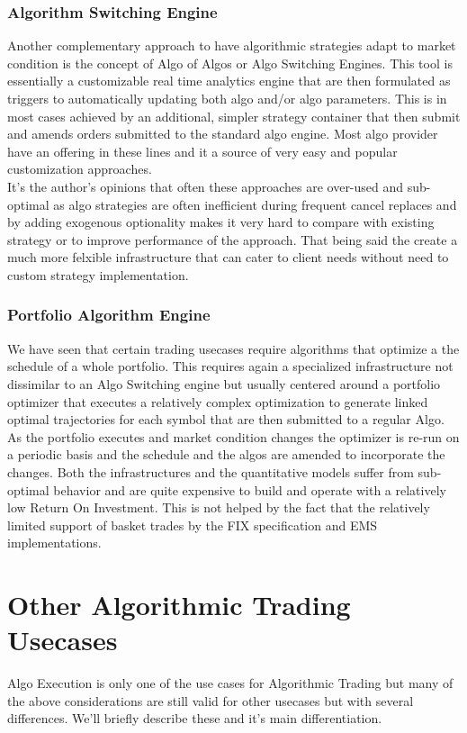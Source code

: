 \subsubsection{Algorithm Switching Engine}
Another complementary approach to have algorithmic strategies adapt to market condition is the concept of Algo of Algos or Algo Switching Engines. This tool is essentially a customizable real time analytics engine that are then formulated as triggers to automatically updating both algo and/or algo parameters. This is in most cases achieved by an additional, simpler strategy container that then submit and amends orders submitted to the standard algo engine. Most algo provider have an offering in these lines and it a source of very easy and popular customization approaches.\\

It's the author's opinions that often these approaches are over-used and sub-optimal as algo strategies are often inefficient during frequent cancel replaces and by adding exogenous optionality makes it very hard to compare with existing strategy or to improve performance of the approach. That being said the create a much more felxible infrastructure that can cater to client needs without need to custom strategy implementation.

\subsubsection{Portfolio Algorithm Engine}
We have seen that certain trading usecases require algorithms that optimize a the schedule of a whole portfolio. This requires again a specialized infrastructure not dissimilar to an Algo Switching engine but usually centered around a portfolio optimizer that executes a relatively complex optimization to generate linked optimal trajectories for each symbol that are then submitted to a regular Algo. As the portfolio executes and market condition changes the optimizer is re-run on a periodic basis and the schedule and the algos are amended to incorporate the changes. Both the infrastructures and the quantitative models suffer from sub-optimal behavior and are quite expensive to build and operate with a relatively low Return On Investment. This is not helped by the fact that the relatively limited  support of basket trades by the FIX specification and EMS implementations.

\section{Other Algorithmic Trading Usecases}
Algo Execution is only one of the use cases for Algorithmic Trading but many of the above considerations are still valid for other usecases but with several differences. We'll briefly describe these and it's main differentiation.

